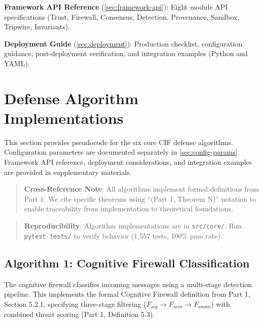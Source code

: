\documentclass[
]{article}
\begin{document}
\textbf{Framework API Reference} (\cref{sec:framework-api}): Eight
module API specifications (Trust, Firewall, Consensus, Detection,
Provenance, Sandbox, Tripwire, Invariants).

\textbf{Deployment Guide} (\cref{sec:deployment}): Production checklist,
configuration guidance, post-deployment verification, and integration
examples (Python and YAML).

\newpage

\newpage

\section{Defense Algorithm Implementations}\label{sec:pseudocode}

This section provides pseudocode for the six core CIF defense
algorithms. Configuration parameters are documented separately in
\cref{sec:config-params}. Framework API reference, deployment
considerations, and integration examples are provided in supplementary
materials.

\begin{quote}
\textbf{Cross-Reference Note}: All algorithms implement formal
definitions from Part 1. We cite specific theorems using ``(Part 1,
Theorem N)'' notation to enable traceability from implementation to
theoretical foundations.
\end{quote}

\begin{quote}
\textbf{Reproducibility}: Algorithm implementations are in
\texttt{src/core/}. Run \texttt{pytest\ tests/} to verify behavior
(1,557 tests, 100\% pass rate).
\end{quote}

\subsection{Algorithm 1: Cognitive Firewall
Classification}\label{sec:alg-firewall}

The cognitive firewall classifies incoming messages using a multi-stage
detection pipeline. This implements the formal Cognitive Firewall
definition from Part 1, Section 5.2.1, specifying three-stage filtering
(\(F_{sig} \to F_{sem} \to F_{anom}\)) with combined threat scoring
(Part 1, Definition 5.3).
\end{document}
